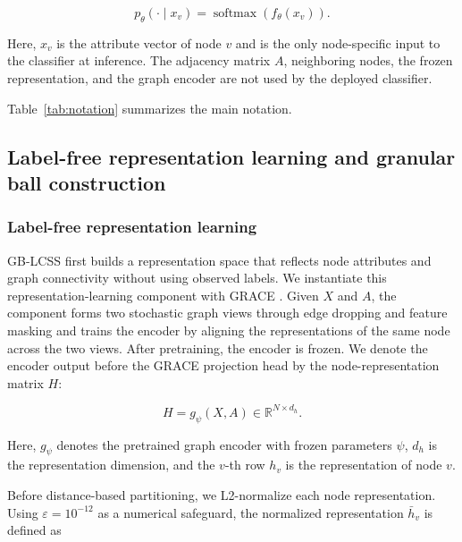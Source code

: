 \documentclass[10pt,letterpaper,nopreprintline]{elsarticle}
\theoremstyle{plain}
\begin{document}
\begin{equation}\label{eq:1}
p_{\theta}( \cdot \mid x_{v}) = \operatorname{softmax}\left( f_{\theta}(x_{v}) \right).
\end{equation}

Here, \(x_{v}\) is the attribute vector of node \(v\) and is the only node-specific input to the classifier at inference. The adjacency matrix \(A\), neighboring nodes, the frozen representation, and the graph encoder are not used by the deployed classifier.

Table~\ref{tab:notation} summarizes the main notation.



\subsection{Label-free representation learning and granular ball construction}\label{sec:3.2}

\subsubsection{Label-free representation learning}\label{sec:3.2.1}

GB-LCSS first builds a representation space that reflects node attributes and graph connectivity without using observed labels. We instantiate this representation-learning component with GRACE \cite{ref12}. Given \(X\) and \(A\), the component forms two stochastic graph views through edge dropping and feature masking and trains the encoder by aligning the representations of the same node across the two views. After pretraining, the encoder is frozen. We denote the encoder output before the GRACE projection head by the node-representation matrix \(H\):

\begin{equation}\label{eq:2}
H = g_{\psi}(X,A) \in \mathbb{R}^{N \times d_{h}}.
\end{equation}

Here, \(g_{\psi}\) denotes the pretrained graph encoder with frozen parameters \(\psi\), \(d_{h}\) is the representation dimension, and the \(v\)-th row \(h_{v}\) is the representation of node \(v\).

\Needspace{64pt}

Before distance-based partitioning, we L2-normalize each node representation. Using \(\varepsilon = 10^{- 12}\) as a numerical safeguard, the normalized representation \({\bar{h}}_{v}\) is defined as
\end{document}
